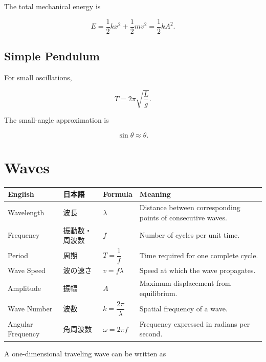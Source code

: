 \documentclass[11pt,a4paper]{article}
\begin{document}
The total mechanical energy is

\[
E=\frac12kx^2+\frac12mv^2
=\frac12kA^2.
\]

\subsection{Simple Pendulum}

For small oscillations,

\[
T=2\pi\sqrt{\frac{L}{g}}.
\]

The small-angle approximation is

\[
\sin\theta\approx\theta.
\]

\section{Waves}

\begin{longtable}{p{} p{} p{} p{}}
\toprule
\textbf{English} & \textbf{日本語} & \textbf{Formula} & \textbf{Meaning} \\
\midrule
\endhead

Wavelength & 波長 &
$\lambda$ &
Distance between corresponding points of consecutive waves. \\

Frequency & 振動数・周波数 &
$f$ &
Number of cycles per unit time. \\

Period & 周期 &
$T=\dfrac1f$ &
Time required for one complete cycle. \\

Wave Speed & 波の速さ &
$v=f\lambda$ &
Speed at which the wave propagates. \\

Amplitude & 振幅 &
$A$ &
Maximum displacement from equilibrium. \\

Wave Number & 波数 &
$k=\dfrac{2\pi}{\lambda}$ &
Spatial frequency of a wave. \\

Angular Frequency & 角周波数 &
$\omega=2\pi f$ &
Frequency expressed in radians per second. \\

\bottomrule
\end{longtable}

A one-dimensional traveling wave can be written as
\end{document}
